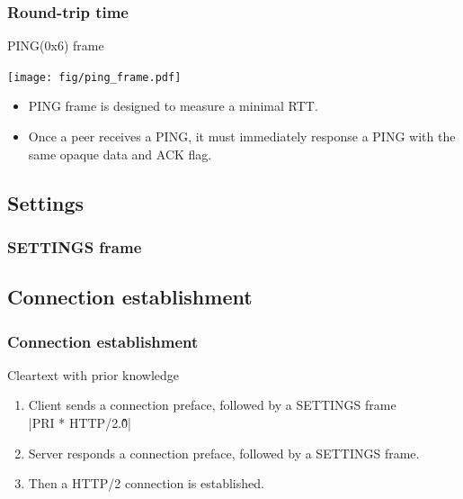 \documentclass[lualatex]{beamer}
\begin{document}
\begin{frame}
  \frametitle{Round-trip time}
  \begin{block}{PING(0x6) frame}
    \begin{center}
      \texttt{[image: fig/ping\_frame.pdf]}
    \end{center}
    \begin{itemize}
    \item PING frame is designed to measure a minimal RTT.
    \item Once a peer receives a PING, it must immediately response a PING with the same opaque data and ACK flag.
    \end{itemize}
  \end{block}
\end{frame}

\subsection{Settings}

\begin{frame}
  \frametitle{SETTINGS frame}
\end{frame}

\subsection{Connection establishment}

\begin{frame}[fragile]
  \frametitle{Connection establishment}
  \begin{block}{Cleartext with prior knowledge}
    \begin{enumerate}
    \item Client sends a connection preface, followed by a SETTINGS frame\\
      |PRI * HTTP/2.0\r\n\r\nSM\r\n\r\n|
    \item Server responds a connection preface, followed by a SETTINGS frame.
    \item Then a HTTP/2 connection is established.
    \end{enumerate}
  \end{block}
\end{frame}
\end{document}
